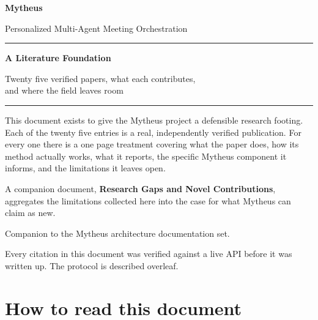 \begin{titlepage}
\centering
\vspace*{2.2cm}

{\LARGE\bfseries Mytheus\par}
\vspace{0.5em}
{\large Personalized Multi-Agent Meeting Orchestration\par}

\vspace{1.6cm}
{\color{rulegrey}\hrule}
\vspace{1.1cm}

{\Large\bfseries A Literature Foundation\par}
\vspace{0.5em}
{\large Twenty five verified papers, what each contributes,\\ and where the field leaves room\par}

\vspace{1.1cm}
{\color{rulegrey}\hrule}
\vspace{2.0cm}

\begin{minipage}{0.82\textwidth}
\small
This document exists to give the Mytheus project a defensible research
footing. Each of the twenty five entries is a real, independently verified
publication. For every one there is a one page treatment covering what the
paper does, how its method actually works, what it reports, the specific
Mytheus component it informs, and the limitations it leaves open.

\vspace{0.7em}
A companion document, \textbf{Research Gaps and Novel Contributions},
aggregates the limitations collected here into the case for what Mytheus can
claim as new.
\end{minipage}

\vfill
{\footnotesize\color{rulegrey}
Companion to the Mytheus architecture documentation set.\par
Every citation in this document was verified against a live API before it was
written up. The protocol is described overleaf.\par}
\vspace{1cm}
\end{titlepage}

\section*{How to read this document}

